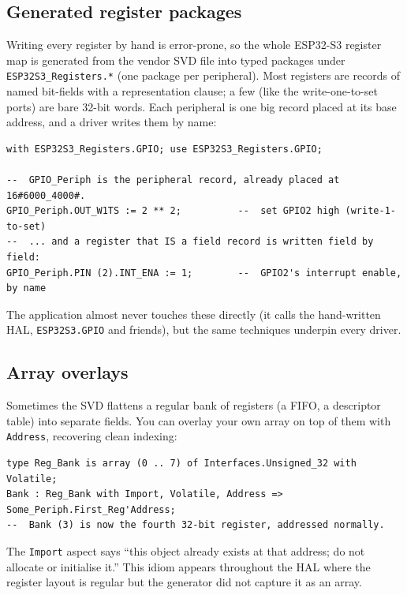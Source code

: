 
\subsection{Generated register packages}

Writing every register by hand is error-prone, so the whole ESP32-S3 register map
is generated from the vendor SVD file into typed packages under
\texttt{ESP32S3\_Registers.*} (one package per peripheral). Most registers are
records of named bit-fields with a representation clause; a few (like the
write-one-to-set ports) are bare 32-bit words. Each peripheral is one big record
placed at its base address, and a driver writes them by name:

\begin{lstlisting}
with ESP32S3_Registers.GPIO; use ESP32S3_Registers.GPIO;

--  GPIO_Periph is the peripheral record, already placed at 16#6000_4000#.
GPIO_Periph.OUT_W1TS := 2 ** 2;          --  set GPIO2 high (write-1-to-set)
--  ... and a register that IS a field record is written field by field:
GPIO_Periph.PIN (2).INT_ENA := 1;        --  GPIO2's interrupt enable, by name
\end{lstlisting}

The application almost never touches these directly (it calls the hand-written
HAL, \texttt{ESP32S3.GPIO} and friends), but the same techniques underpin every
driver.

\subsection{Array overlays}

Sometimes the SVD flattens a regular bank of registers (a FIFO, a descriptor
table) into separate fields. You can overlay your own array on top of them with
\texttt{Address}, recovering clean indexing:

\begin{lstlisting}
type Reg_Bank is array (0 .. 7) of Interfaces.Unsigned_32 with Volatile;
Bank : Reg_Bank with Import, Volatile, Address => Some_Periph.First_Reg'Address;
--  Bank (3) is now the fourth 32-bit register, addressed normally.
\end{lstlisting}

The \texttt{Import} aspect says ``this object already exists at that address; do
not allocate or initialise it.'' This idiom appears throughout the HAL where the
register layout is regular but the generator did not capture it as an array.


